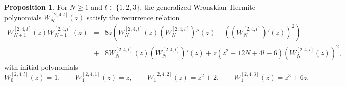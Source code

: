 \documentclass[preprint,3p,10pt]{elsarticle}
\theoremstyle{definition}
\newtheorem{proposition}[definition]{Proposition}
\begin{document}
\begin{proposition}
\label{prop:k4-W-recurrence}
For $N\geq1$ and $l \in \{1,2,3\}$, the generalized Wronskian--Hermite polynomials \(W_N^{[2,4,l]}(z)\) satisfy the recurrence relation
\begin{eqnarray}
\label{eq:k4-W-recurrence}
    W_{N+1}^{[2,4,l]}(z)W_{N-1}^{[2,4,l]}(z)&=&8z\left(W_N^{[2,4,l]}(z)\left(W_N^{[2,4,l]}\right)''(z)-\left(\left(W_N^{[2,4,l]}\right)'(z)\right)^2\right) \nonumber\\
    &+&8W_N^{[2,4,l]}(z)\left(W_N^{[2,4,l]}\right)'(z)+z\left(z^2+12N+4l-6\right)\left(W_N^{[2,4,l]}(z)\right)^2,
\end{eqnarray}
with initial polynomials
\begin{equation}
\label{eq:k4-W-initial-values}
    W_0^{[2,4,l]}(z)=1,\qquad W_1^{[2,4,1]}(z)=z,\qquad W_1^{[2,4,2]}(z)=z^2+2,\qquad W_1^{[2,4,3]}(z)=z^3+6z.
\end{equation}
\end{proposition}
\end{document}
